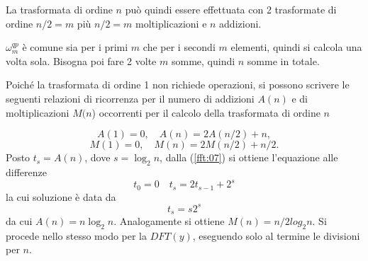 \begin{thproof}
La trasformata di ordine $n$ pu\`o quindi essere effettuata
 con 2 trasformate  di ordine $n/2 =m $ pi\`u $n/2= m$ 
moltiplicazioni e $n$ addizioni.
\begin{notes}
  $\omega_m^{qp}$ \`e comune sia per i primi $m$ che per i secondi $m$
elementi, quindi si calcola una volta sola.
Bisogna poi fare 2 volte $m$ somme, quindi $n$ somme in totale.
\end{notes}
 Poich\'e la trasformata di ordine 1 non richiede operazioni, si
possono scrivere le seguenti relazioni di ricorrenza per il numero di
addizioni $A(n)$ e di moltiplicazioni $M (n$) occorrenti per il
calcolo della trasformata di ordine $n$

\begin{equation}
  \label{fft:07}
    A(1) = 0, \quad A(n) = 2A(n/2) + n,
\end{equation}
$$ M (1) = 0,\quad  M (n) = 2M (n/2) + n/2.
 $$
Posto $t_s = A(n)$, dove $s=\log_2 n$, dalla (\ref{fft:07}) si
ottiene l'equazione alle differenze
$$t_0 = 0 \quad t_s = 2t_{s-1} + 2^{s} $$
la cui soluzione \`e data da
$$ t_s = s2^s $$
da cui $A(n) = n \log_2 n$. Analogamente si ottiene $M (n) = n/2 log_2
n$. Si procede nello stesso modo per la $DFT(y)$, eseguendo solo al
termine le divisioni per $n$.

\end{thproof}



